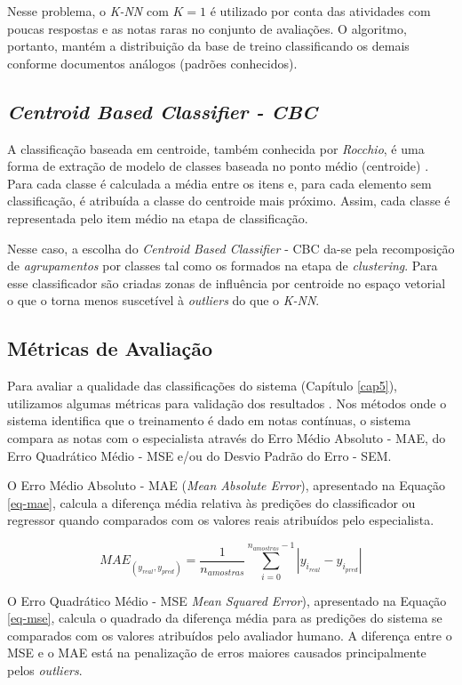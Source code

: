 Nesse problema, o \textit{K-NN} com $ K = 1 $ é utilizado por conta das atividades com poucas respostas e as notas raras no conjunto de avaliações. O algoritmo, portanto, mantém a distribuição da base de treino classificando os demais conforme documentos análogos (padrões conhecidos).

\subsection{{\it Centroid Based Classifier - CBC}} \label{cbc}
A classificação baseada em centroide, também conhecida por \textit{Rocchio}, é uma forma de extração de modelo de classes baseada no ponto médio (centroide) \cite{baeza2011}. Para cada classe é calculada a média entre os itens e, para cada elemento sem classificação, é atribuída a classe do centroide mais próximo. Assim, cada classe é representada pelo item médio na etapa de classificação.

Nesse caso, a escolha do \textit{Centroid Based Classifier} - CBC da-se pela recomposição de \textit{agrupamentos} por classes tal como os formados na etapa de \textit{clustering}. Para esse classificador são criadas zonas de influência por centroide no espaço vetorial o que o torna menos suscetível à \textit{outliers} do que o \textit{K-NN}.

\subsection{Métricas de Avaliação} \label{metricas}
Para avaliar a qualidade das classificações do sistema (Capítulo \ref{cap5}), utilizamos algumas métricas para validação dos resultados \cite{cohen1995}. Nos métodos onde o sistema identifica que o treinamento é dado em notas contínuas, o sistema compara as notas com o especialista através do Erro Médio Absoluto - MAE, do Erro Quadrático Médio - MSE e/ou do Desvio Padrão do Erro - SEM.

O Erro Médio Absoluto - MAE (\textit{Mean Absolute Error}), apresentado na Equação \ref{eq-mae}, calcula a diferença média relativa às predições do classificador ou regressor quando comparados com os valores reais atribuídos pelo especialista.

\begin{equation}
MAE_(y_{real},y_{pred}) = \frac{1}{n_{amostras}}\sum_{i=0}^{n_{amostras}-1}|y_{i_{real}}-y_{i_{pred}}|
\label{eq-mae}
\end{equation}

O Erro Quadrático Médio - MSE \textit{Mean Squared Error}), apresentado na Equação \ref{eq-mse}, calcula o quadrado da diferença média para as predições do sistema se comparados com os valores atribuídos pelo avaliador humano. A diferença entre o MSE e o MAE está na penalização de erros maiores causados principalmente pelos \textit{outliers}.

